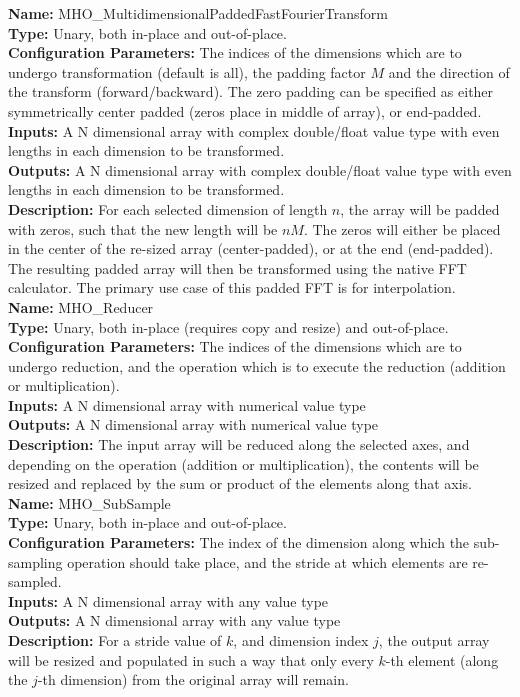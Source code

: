 \noindent \textbf{Name:} MHO\_MultidimensionalPaddedFastFourierTransform \\
\textbf{Type:} Unary, both in-place and out-of-place. \\
\textbf{Configuration Parameters:} The indices of the dimensions which are to undergo transformation (default is all),
the padding factor $M$ and the direction of the transform (forward/backward). The zero padding can be specified as either symmetrically center padded (zeros place in middle of array), or end-padded.\\
\textbf{Inputs:} A N dimensional array with complex double/float value type with even lengths in each dimension to be transformed. \\
\textbf{Outputs:} A N dimensional array with complex double/float value type with even lengths in each dimension to be transformed.\\
\textbf{Description:} For each selected dimension of length $n$, the array will be padded with zeros, such that the new length will be $nM$. The zeros will either be placed in the center of the re-sized array (center-padded), or at the end (end-padded). The resulting padded array will then be transformed using the native FFT calculator. The primary use case of this padded FFT is for interpolation.\\


\noindent \textbf{Name:} MHO\_Reducer  \\
\textbf{Type:} Unary, both in-place (requires copy and resize) and out-of-place. \\
\textbf{Configuration Parameters:} The indices of the dimensions which are to undergo reduction, and the operation which is to execute the reduction (addition or multiplication). \\
\textbf{Inputs:} A N dimensional array with numerical value type\\
\textbf{Outputs:} A N dimensional array with numerical value type\\
\textbf{Description:} The input array will be reduced along the selected axes, and depending on the operation (addition or multiplication), the contents will be resized and replaced by the sum or product of the elements along that axis.\\

\noindent \textbf{Name:} MHO\_SubSample  \\
\textbf{Type:} Unary, both in-place and out-of-place. \\
\textbf{Configuration Parameters:} The index of the dimension along which the sub-sampling operation should take place, and the stride at which elements are re-sampled.\\
\textbf{Inputs:} A N dimensional array with any value type\\
\textbf{Outputs:} A N dimensional array with any value type\\
\textbf{Description:} For a stride value of $k$, and dimension index $j$, the output array will be resized and populated in such a way that only every $k$-th element (along the $j$-th dimension) from the original array will remain.\\

